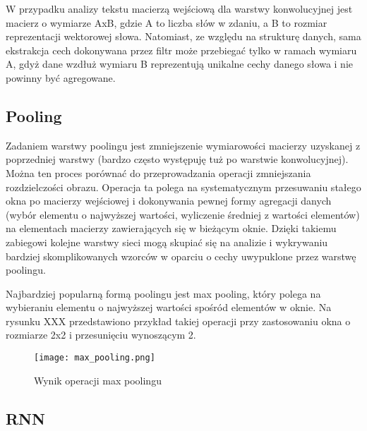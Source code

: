 W przypadku analizy tekstu macierzą wejściową dla warstwy konwolucyjnej jest macierz o wymiarze AxB, gdzie A to liczba słów w zdaniu, a B to rozmiar reprezentacji wektorowej słowa. Natomiast, ze względu na strukturę danych, sama ekstrakcja cech dokonywana przez filtr może przebiegać tylko w ramach wymiaru A, gdyż dane wzdłuż wymiaru B reprezentują unikalne cechy danego słowa i nie powinny być agregowane.


\subsection{Pooling}



Zadaniem warstwy poolingu jest zmniejszenie wymiarowości macierzy uzyskanej z poprzedniej warstwy (bardzo często występuję tuż po warstwie konwolucyjnej). Można ten proces porównać do przeprowadzania operacji zmniejszania rozdzielczości obrazu. Operacja ta polega na systematycznym przesuwaniu stałego okna po macierzy wejściowej i dokonywania pewnej formy agregacji danych (wybór elementu o najwyższej wartości, wyliczenie średniej z wartości elementów) na elementach macierzy zawierających się w bieżącym oknie. Dzięki takiemu zabiegowi kolejne warstwy sieci mogą skupiać się na analizie i wykrywaniu bardziej skomplikowanych wzorców w oparciu o cechy uwypuklone przez warstwę poolingu. 

 

Najbardziej popularną formą poolingu jest max pooling, który polega na wybieraniu elementu o najwyższej wartości spośród elementów w oknie. Na rysunku XXX przedstawiono przykład takiej operacji przy zastosowaniu okna o rozmiarze 2x2 i przesunięciu wynoszącym 2. 

\begin{figure}[!h]
    \label{fig:max_pooling}
    \centering \texttt{[image: max\_pooling.png]}
    \caption{Wynik operacji max poolingu}
\end{figure}


\subsection{RNN}




